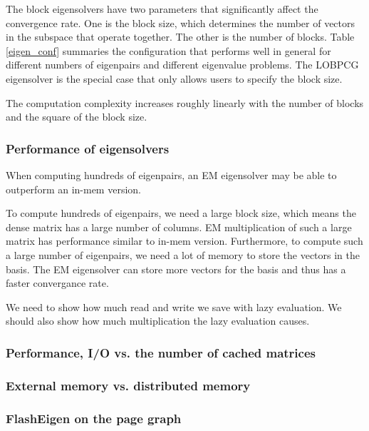 The block eigensolvers have two parameters that significantly affect
the convergence rate. One is the block size, which determines the number
of vectors in the subspace that operate together. The other is the number
of blocks. Table \ref{eigen_conf} summaries the configuration that performs
well in general for different numbers of eigenpairs and different eigenvalue
problems. The LOBPCG eigensolver is the special case that only allows users
to specify the block size.

The computation complexity increases roughly linearly with the number of blocks
and the square of the block size.

\subsubsection{Performance of eigensolvers}

When computing hundreds of eigenpairs, an EM eigensolver may be able to outperform
an in-mem version.

To compute hundreds of eigenpairs, we need a large block size, which means
the dense matrix has a large number of columns. EM multiplication of such
a large matrix has performance similar to in-mem version. Furthermore,
to compute such a large number of eigenpairs, we need a lot of memory to
store the vectors in the basis. The EM eigensolver can store more vectors
for the basis and thus has a faster convergance rate.

We need to show how much read and write we save with lazy evaluation. We should
also show how much multiplication the lazy evaluation causes.


\subsubsection{Performance, I/O vs. the number of cached matrices}

\subsubsection{External memory vs. distributed memory}

\subsubsection{FlashEigen on the page graph}
